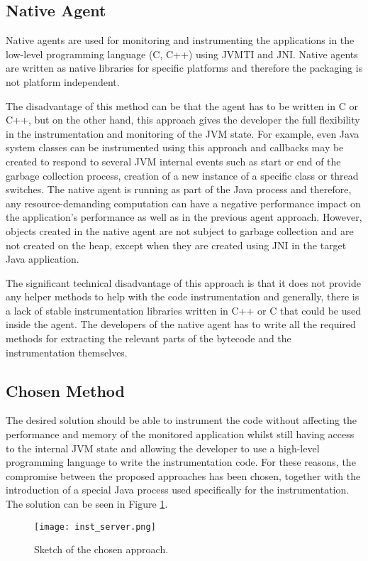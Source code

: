 \subsection{Native Agent}
Native agents are used for monitoring and instrumenting the applications in the low-level programming language (C, C++) using JVMTI and JNI. Native agents are written as native libraries for specific platforms and therefore the packaging is not platform independent. 

The disadvantage of this method can be that the agent has to be written in C or C++, but on the other hand, this approach gives the developer the full flexibility in the instrumentation and monitoring of the JVM state. For example, even Java system classes can be instrumented using this approach and callbacks may be created to respond to several JVM internal events such as start or end of the garbage collection process, creation of a new instance of a specific class or thread switches. The native agent is running as part of the Java process and therefore, any resource-demanding computation can have a negative performance impact on the application's performance as well as in the previous agent approach. However, objects created in the native agent are not subject to garbage collection and are not created on the heap, except when they are created using JNI in the target Java application.

The significant technical disadvantage of this approach is that it does not provide any helper methods to help with the code instrumentation and generally, there is a lack of stable instrumentation libraries written in C++ or C that could be used inside the agent. The developers of the native agent has to write all the required methods for extracting the relevant parts of the bytecode and the instrumentation themselves.
\subsection{Chosen Method}
\label{subsec:inst_jvm}
The desired solution should be able to instrument the code without affecting the performance and memory of the monitored application whilst still having access to the internal JVM state and allowing the developer to use a high-level programming language to write the instrumentation code. For these reasons, the compromise between the proposed approaches has been chosen, together with the introduction of a special Java process used specifically for the instrumentation. The solution can be seen in Figure \ref{fig:inst_server_basic}.
\begin{figure}
	\centering
	\texttt{[image: inst\_server.png]}
	\caption{Sketch of the chosen approach.}
	\label{fig:inst_server_basic}
\end{figure}

